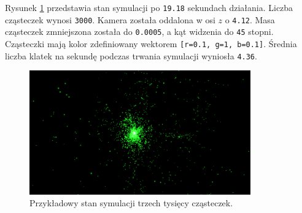 \documentclass[12pt, twoside, openany]{report}
\begin{document}

Rysunek \ref{fig:stan4} przedstawia stan symulacji po \texttt{19.18} sekundach działania. Liczba cząsteczek wynosi \texttt{3000}. Kamera została oddalona w osi $z$ o \texttt{4.12}. Masa cząsteczek zmniejszona została do \texttt{0.0005}, a kąt widzenia do \texttt{45} stopni. Cząsteczki mają kolor zdefiniowany wektorem \texttt{[r=0.1, g=1, b=0.1]}. Średnia liczba klatek na sekundę podczas trwania symulacji wyniosła \texttt{4.36}.

\begin{figure}[H]
\centering
\includegraphics[width=0.85\textwidth,height=\textheight,keepaspectratio]{1_065.png}
\caption{Przykładowy stan symulacji trzech tysięcy cząsteczek.}
\label{fig:stan4}
\end{figure}
\end{document}
